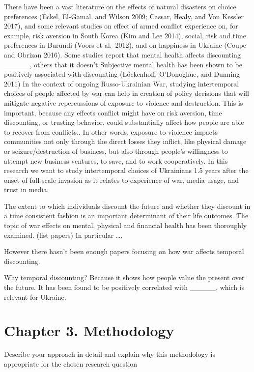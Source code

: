 \documentclass[
  letterpaper,
  DIV=11,
  numbers=noendperiod]{scrartcl}
\begin{document}
There have been a vast literature on the effects of natural disasters on
choice preferences (Eckel, El-Gamal, and Wilson 2009; Cassar, Healy, and
Von Kessler 2017), and some relevant studies on effect of armed conflict
experience on, for example, risk aversion in South Korea (Kim and Lee
2014), social, risk and time preferences in Burundi (Voors et al.~2012),
and on happiness in Ukraine (Coupe and Obrizan 2016). Some studies
report that mental health affects discounting \_\_\_\_\_, others that it
doesn't Subjective mental health has been shown to be positively
associated with discounting (Löckenhoff, O'Donoghue, and Dunning 2011)
In the context of ongoing Russo-Ukrainian War, studying intertemporal
choices of people affected by war can help in creation of policy
decisions that will mitigate negative repercussions of exposure to
violence and destruction. This is important, because any effects
conflict might have on risk aversion, time discounting, or trusting
behavior, could substantially affect how people are able to recover from
conflicts.. In other words, exposure to violence impacts communities not
only through the direct losses they inflict, like physical damage or
seizure/destruction of business, but also through people's willingness
to attempt new business ventures, to save, and to work cooperatively. In
this research we want to study intertemporal choices of Ukrainians 1.5
years after the onset of full-scale invasion as it relates to experience
of war, media usage, and trust in media.

The extent to which individuals discount the future and whether they
discount in a time consistent fashion is an important determinant of
their life outcomes. The topic of war effects on mental, physical and
financial health has been thoroughly examined. (list papers) In
particular \ldots.

However there hasn't been enough papers focusing on how war affects
temporal discounting.

Why temporal discounting? Because it shows how people value the present
over the future. It has been found to be positively correlated with
\_\_\_\_\_, which is relevant for Ukraine.

\hypertarget{chapter-3.-methodology}{%
\section{Chapter 3. Methodology}\label{chapter-3.-methodology}}

Describe your approach in detail and explain why this methodology is
appropriate for the chosen research question
\end{document}
